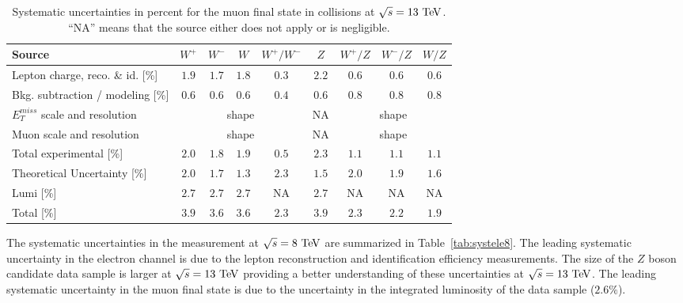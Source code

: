 \begin{table}[htbp]
\centering
\small
\begin {tabular}  {lcccccccc}
\hline
Source & $W^+$ & $W^-$ & $W$ & $W^+/W^-$ & $Z$ & $W^+/Z$ & $W^-/Z$ & $W/Z$ \\
\hline
Lepton charge, reco. \& id. [\%] & $1.9$ & $1.7$ & $1.8$ & $0.3$ & $2.2$ & $0.6$ & $0.6$ & $0.6$ \\
Bkg. subtraction / modeling [\%] & $0.6$ & $0.6$ & $0.6$ & $0.4$ & $0.6$ & $0.8$ & $0.8$ & $0.8$ \\ 
$E_{T}^{miss}$ scale and resolution  & \multicolumn{4}{c}{shape}  & NA & \multicolumn{3}{c}{shape}  \\ 
Muon scale and resolution & \multicolumn{4}{c}{shape}  & NA & \multicolumn{3}{c}{shape}  \\ 
\hline
Total experimental [\%] & $2.0$ & $1.8$ & $1.9$ & $0.5$ & $2.3$ & $1.1$ & $1.1$ & $1.1$ \\
\hline 
Theoretical Uncertainty [\%] & $2.0$ & $1.7$ & $1.3$ & $2.3$ & $1.5$ & $2.0$ & $1.9$ & $1.6$ \\
\hline
Lumi [\%] & $2.7$ & $2.7$ & $2.7$ & NA & $2.7$ & NA & NA & NA \\
\hline
Total [\%] & $3.9$ & $3.6$ & $3.6$ & $2.3$ & $3.9$ & $2.3$ & $2.2$ & $1.9$ \\
\hline
\end {tabular}
\caption{ \label{tab:syst_mu}
Systematic uncertainties in percent for the muon final state in collisions at $\sqrt{s}=13~\mathrm{Te\kern -0.1em V}$. ``NA'' means that the source either does not apply or is negligible.}
\end{table} 
The systematic uncertainties in the measurement at $\sqrt{s}=8~\mathrm{Te\kern -0.1em V}$ are summarized in Table~\ref{tab:systele8}. The leading systematic uncertainty in the electron channel is due to the lepton reconstruction and identification efficiency measurements. The size of the $Z$ boson candidate data sample is larger at $\sqrt{s}=13~\mathrm{Te\kern -0.1em V}$ providing a better understanding of these uncertainties at $\sqrt{s}=13~\mathrm{Te\kern -0.1em V}$. The leading systematic uncertainty in the muon final state is due to the uncertainty in the integrated luminosity of the data sample ($2.6\%$).  

